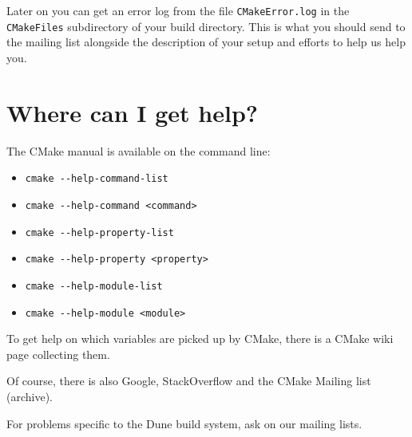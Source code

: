 \documentclass[a4paper,10pt,DIV9,headings=small]{scrartcl}
\begin{document}
Later on you can get an error log from the file \lstinline!CMakeError.log! in the \lstinline!CMakeFiles! subdirectory of your build directory. This is what you should send to the mailing list alongside the description of your setup and efforts to help us help you.

\section{Where can I get help?}
\label{help}

The CMake manual is available on the command line:
 \begin{itemize}
  \item \verb!cmake --help-command-list!
  \item \verb!cmake --help-command <command>!
  \item \verb!cmake --help-property-list!
  \item \verb!cmake --help-property <property>!
  \item \verb!cmake --help-module-list!
  \item \verb!cmake --help-module <module>!
 \end{itemize}
  \vspace{.5 cm}
 To get help on which variables are picked up by CMake, there is a CMake wiki page collecting them.

 Of course, there is also Google, StackOverflow and the CMake Mailing list (archive).

 For problems specific to the Dune build system, ask on our mailing lists.
\end{document}
